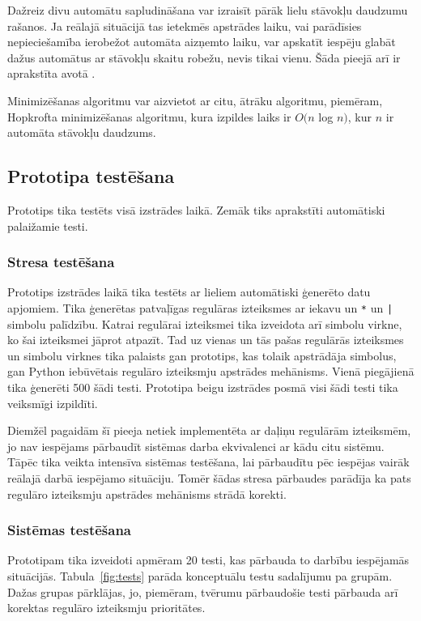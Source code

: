 Dažreiz divu automātu sapludināšana var izraisīt pārāk lielu stāvokļu daudzumu rašanos. Ja reālajā situācijā tas ietekmēs apstrādes laiku, vai parādīsies nepieciešamība ierobežot automāta aizņemto laiku, var apskatīt iespēju glabāt dažus automātus ar stāvokļu skaitu robežu, nevis tikai vienu. Šāda pieejā arī ir aprakstīta avotā \cite{Yu:FMR}.

Minimizēšanas algoritmu var aizvietot ar citu, ātrāku algoritmu, piemēram, Hopkrofta minimizēšanas algoritmu, kura izpildes laiks ir $O(n$ log $n)$, kur $n$ ir automāta stāvokļu daudzums. \cite{Berstel:MA}

\subsection{\label{sbs:res_testing}Prototipa testēšana}

Prototips tika testēts visā izstrādes laikā. Zemāk tiks aprakstīti automātiski palaižamie testi. 

\subsubsection{Stresa testēšana}

Prototips izstrādes laikā tika testēts ar lieliem automātiski ģenerēto datu apjomiem. Tika ģenerētas patvaļīgas regulāras izteiksmes ar iekavu un \verb|*| un \verb/|/ simbolu palīdzību. Katrai regulārai izteiksmei tika izveidota arī simbolu virkne, ko šai izteiksmei jāprot atpazīt. Tad uz vienas un tās pašas regulārās izteiksmes un simbolu virknes tika palaists gan prototips, kas tolaik apstrādāja simbolus, gan Python iebūvētais regulāro izteiksmju apstrādes mehānisms. Vienā piegājienā tika ģenerēti 500 šādi testi. Prototipa beigu izstrādes posmā visi šādi testi tika veiksmīgi izpildīti.

Diemžēl pagaidām šī pieeja netiek implementēta ar daļiņu regulārām izteiksmēm, jo nav iespējams pārbaudīt sistēmas darba ekvivalenci ar kādu citu sistēmu. Tāpēc tika veikta intensīva sistēmas testēšana, lai pārbaudītu pēc iespējas vairāk reālajā darbā iespējamo situāciju. Tomēr šādas stresa pārbaudes parādīja ka pats regulāro izteiksmju apstrādes mehānisms strādā korekti.

\subsubsection{Sistēmas testēšana}

Prototipam tika izveidoti apmēram 20 testi, kas pārbauda to darbību iespējamās situācijās. Tabula~\ref{fig:tests} parāda konceptuālu testu sadalījumu pa grupām. Dažas grupas pārklājas, jo, piemēram, tvērumu pārbaudošie testi pārbauda arī korektas regulāro izteiksmju prioritātes.

